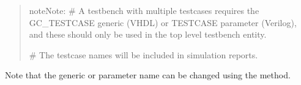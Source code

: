 \documentclass[letterpaper,10pt,english]{sphinxmanual}
\begin{document}
\begin{quote}
\begin{sphinxadmonition}{note}{Note:}
\sphinxAtStartPar
\# A testbench with multiple testcases requires the GC\_TESTCASE generic (VHDL) or TESTCASE parameter
(Verilog), and these should only be used in the top level testbench entity.

\sphinxAtStartPar
\# The testcase names will be included in simulation reports.
\end{sphinxadmonition}

\begin{sphinxVerbatim}[commandchars=\\\{\}]
\end{sphinxVerbatim}
\end{quote}

\sphinxAtStartPar
Note that the  generic or  parameter name can be changed using
the {\hyperref[\detokenize{api:set-testcase-identifier-name}]{}} method.
\end{document}
